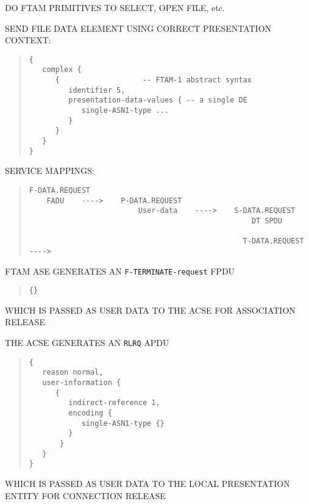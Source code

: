\begin{bwslide}

\begin{nrtc}
\item	DO FTAM PRIMITIVES TO SELECT, OPEN FILE, etc.

\item	SEND FILE DATA ELEMENT USING CORRECT PRESENTATION CONTEXT:
\begin{quote}\small\begin{verbatim}
{
   complex {
      {                   -- FTAM-1 abstract syntax
         identifier 5,
         presentation-data-values { -- a single DE
            single-ASN1-type ...
         }
      }
   }
}
\end{verbatim}\end{quote}

\item	SERVICE MAPPINGS:
\begin{quote}\small\begin{verbatim}
F-DATA.REQUEST
    FADU    ---->    P-DATA.REQUEST
                         User-data    ---->    S-DATA.REQUEST
                                                   DT SPDU

                                                 T-DATA.REQUEST  ---->
\end{verbatim}\end{quote}
\end{nrtc}
\end{bwslide}


\begin{bwslide}

\begin{nrtc}
\item	FTAM ASE GENERATES AN \verb"F-TERMINATE-request" FPDU
\begin{quote}\small\begin{verbatim}
{}
\end{verbatim}\end{quote}

\item	WHICH IS PASSED AS USER DATA TO THE ACSE FOR ASSOCIATION RELEASE
\end{nrtc}
\end{bwslide}


\begin{bwslide}

\begin{nrtc}
\item	THE ACSE GENERATES AN \verb"RLRQ" APDU
\begin{quote}\small\begin{verbatim}
{
   reason normal,
   user-information {
      {
         indirect-reference 1,
         encoding {
            single-ASN1-type {}
         }
       }
   }
}
\end{verbatim}\end{quote}

\item	WHICH IS PASSED AS USER DATA TO THE LOCAL PRESENTATION ENTITY FOR
	CONNECTION RELEASE
\end{nrtc}
\end{bwslide}


